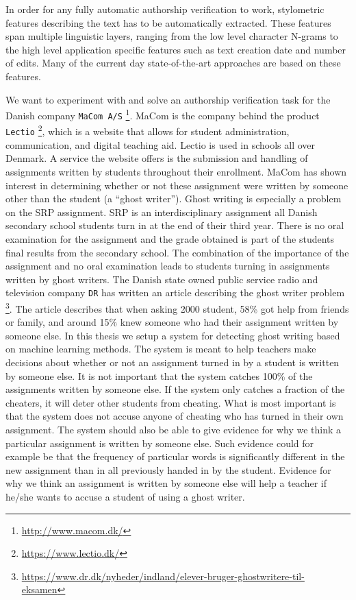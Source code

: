 In order for any fully automatic authorship verification to work, stylometric
features describing the text has to be automatically extracted. These features
span multiple linguistic layers, ranging from the low level character N-grams
to the high level application specific features such as text creation date and
number of edits. Many of the current day state-of-the-art approaches are based
on these features.


We want to experiment with and solve an authorship verification task for the
Danish company \texttt{MaCom A/S} \footnote{\url{http://www.macom.dk/}}.
MaCom is the company behind the product \texttt{Lectio}
\footnote{\url{https://www.lectio.dk/}}, which is a website that allows for
student administration, communication, and digital teaching aid. Lectio is used
in schools all over Denmark. A service the website offers is the submission
and handling of assignments written by students throughout their enrollment.
MaCom has shown interest in determining whether or not these assignment
were written by someone other than the student (a ``ghost writer''). Ghost
writing is especially a problem on the \gls{SRP} assignment. \gls{SRP} is
an interdisciplinary assignment all Danish secondary school students turn
in at the end of their third year. There is no oral examination for the
assignment and the grade obtained is part of the students final results from
the secondary school. The combination of the importance of the assignment
and no oral examination leads to students turning in assignments written by
ghost writers. The Danish state owned public service radio and television
company \texttt{DR} has written an article describing the ghost writer problem
\footnote{\url{https://www.dr.dk/nyheder/indland/elever-bruger-ghostwritere-til-
eksamen}}. The article describes that when asking 2000 student, 58\% got help
from friends or family, and around 15\% knew someone who had their assignment
written by someone else. In this thesis we setup a system for detecting ghost
writing based on machine learning methods. The system is meant to help teachers
make decisions about whether or not an assignment turned in by a student is
written by someone else. It is not important that the system catches 100\% of
the assignments written by someone else. If the system only catches a fraction
of the cheaters, it will deter other students from cheating. What is most
important is that the system does not accuse anyone of cheating who has turned
in their own assignment. The system should also be able to give evidence for why
we think a particular assignment is written by someone else. Such evidence could
for example be that the frequency of particular words is significantly different
in the new assignment than in all previously handed in by the student. Evidence
for why we think an assignment is written by someone else will help a teacher if
he/she wants to accuse a student of using a ghost writer.


